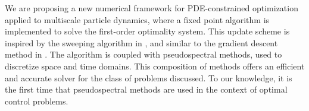 We are proposing a new numerical framework for PDE-constrained optimization applied to multiscale particle dynamics, where a fixed point algorithm is implemented to solve the first-order optimality system. This update scheme is inspired by the sweeping algorithm in \cite{albi2016mean}, and similar to the gradient descent method in \cite{Burger1}. The algorithm is coupled with pseudospectral methods, used to discretize space and time domains. This composition of methods offers an efficient and accurate solver for the class of problems discussed. To our knowledge, it is the first time that pseudospectral methods are used in the context of optimal control problems.